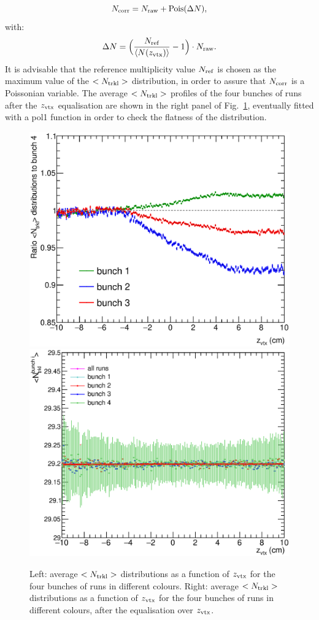 \begin{equation} 
\label{eq:NtrklCorr}
N_{\rm corr} = N_{\rm raw} + {\rm Pois}(\Delta N),
\end{equation}
with:
\begin{equation} 
\label{eq:NtrklCorr}
\Delta N = \Big (\frac{N_{\rm ref}}{\langle N(z_{\rm vtx}) \rangle} -1 \Big ) \cdot N_{\rm raw}.
\end{equation}
 It is advisable that the reference multiplicity value $N_{\rm ref}$ is chosen as the
 maximum value of the $<N_{\rm trkl}>$ distribution, in order to assure
 that $N_{\rm corr}$ is a Poissonian variable. 
The average $<N_{\rm trkl}>$ profiles of the four bunches of runs 
after the $z_{\rm vtx}$ equalisation are shown in the right panel of 
Fig.~\ref{fig:FourBunches}, eventually fitted with a pol1 function in order
to check the flatness of the distribution. 

\begin{figure}[h]
\centering
 \includegraphics[width=.49\textwidth]{FigCap6/UncorrNtrklProfileDataRatio.eps}
 \includegraphics[width=.49\textwidth]{FigCap6/NtrkProfilesDataAfterZVxtEqual.eps}
 \caption{Left: average $<N_{\rm trkl}>$ distributions as a function of $z_{\rm vtx}$ for the four bunches of runs in different colours. Right: average $<N_{\rm trkl}>$ distributions as a function of $z_{\rm vtx}$ for the four bunches of runs in different colours, after the equalisation over $z_{\rm vtx}$.}
 \label{fig:FourBunches}
\end{figure}

